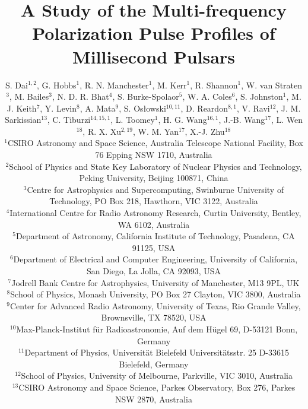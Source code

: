 \documentclass[useAMS,usenatbib]{mn2e}
\begin{document}
\title[A Study of the Multi-frequency Polarization Pulse Profiles of Millisecond Pulsars]{A Study of the Multi-frequency Polarization Pulse Profiles of Millisecond Pulsars}
\author[S. Dai et al.]{S. Dai$^{1,2}$, G. Hobbs$^1$, R. N. Manchester$^1$, M. Kerr$^1$, R. Shannon$^1$, W. van Straten$^3$,   
\newauthor M. Bailes$^3$, N. D. R. Bhat$^4$, S. Burke-Spolaor$^5$, W. A. Coles$^6$, S. Johnston$^1$, M. J. Keith$^7$, 
\newauthor Y. Levin$^8$, A. Mata$^9$, S. Os\l owski$^{10,11}$, D. Reardon$^{8,1}$, V. Ravi$^{12}$, J. M. Sarkissian$^{13}$, 
\newauthor C. Tiburzi$^{14,15,1}$, L. Toomey$^{1}$, H. G. Wang$^{16,1}$, J.-B. Wang$^{17}$, L. Wen$^{18}$, R. X. Xu$^{2,19}$, 
\newauthor W. M. Yan$^{17}$, X.-J. Zhu$^{18}$\\
$^1$CSIRO Astronomy and Space Science, Australia Telescope National Facility, Box 76 Epping NSW 1710, Australia\\
$^2$School of Physics and State Key Laboratory of Nuclear Physics and Technology, Peking University, Beijing 100871, China\\
$^3$Centre for Astrophysics and Supercomputing, Swinburne University of Technology, PO Box 218, Hawthorn, VIC 3122, Australia\\
$^4$International Centre for Radio Astronomy Research, Curtin University, Bentley, WA 6102, Australia\\
$^5$Department of Astronomy, California Institute of Technology, Pasadena, CA 91125, USA\\
$^6$Department of Electrical and Computer Engineering, University of California, San Diego, La Jolla, CA 92093, USA\\
$^7$Jodrell Bank Centre for Astrophysics, University of Manchester, M13 9PL, UK\\
$^8$School of Physics, Monash University, PO Box 27 Clayton, VIC 3800, Australia\\
$^9$Center for Advanced Radio Astronomy, University of Texas, Rio Grande Valley, Brownsville, TX 78520, USA\\
$^{10}$Max-Planck-Institut f\"{u}r Radioastronomie, Auf dem H\"{u}gel 69, D-53121 Bonn, Germany\\
$^{11}$Department of Physics, Universit\"{a}t Bielefeld Universit\"{a}tsstr. 25 D-33615 Bielefeld, Germany\\
$^{12}$School of Physics, University of Melbourne, Parkville, VIC 3010, Australia\\
$^{13}$CSIRO Astronomy and Space Science, Parkes Observatory, Box 276, Parkes NSW 2870, Australia\\
}
\end{document}
